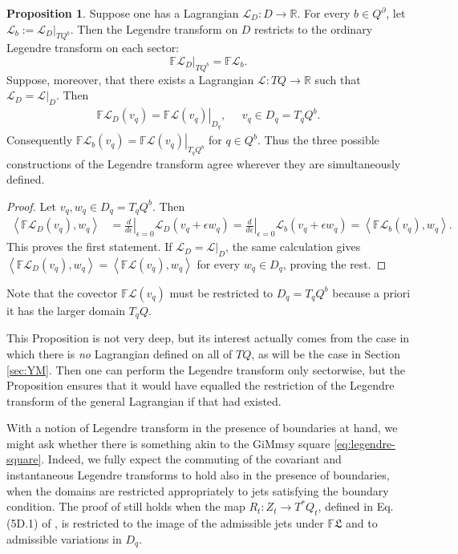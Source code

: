 \documentclass{article}
\newcommand{\R}{\mathbb{R}}
\theoremstyle{definition}
\newtheorem{proposition}[definition]{Proposition}
\begin{document}
\begin{proposition}\label{prop:legendresectors}
Suppose one has a Lagrangian $\mathcal{L}_D\colon D\to \R$. For every \(b\in Q^\partial\), let $\mathcal L_b:=\mathcal L_D|_{TQ^b}$. Then the Legendre transform on \(D\) restricts to the ordinary Legendre
transform on each sector:
\[
\left.\mathbb F\mathcal L_D\right|_{TQ^b}
=
\mathbb F\mathcal L_b.
\]
Suppose, moreover, that there exists a Lagrangian $\mathcal L\colon TQ\longrightarrow\mathbb R$ such that \(\mathcal L_D=\mathcal L|_D\). Then
\begin{align*}
\mathbb F\mathcal L_D(v_q)
=
\left.\mathbb F\mathcal L(v_q)\right|_{D_q},\;\;\;\;\; v_q\in D_q=T_qQ^b.
\end{align*}
Consequently $\mathbb F\mathcal L_b(v_q)
=
\left.\mathbb F\mathcal L(v_q)\right|_{T_qQ^b}$ for $q\in Q^b$. Thus the three possible constructions of the Legendre transform agree
wherever they are simultaneously defined.
\end{proposition}
\begin{proof}
Let \(v_q,w_q\in D_q=T_qQ^b\). Then
\begin{align*}
\left\langle\mathbb F\mathcal L_D(v_q),w_q\right\rangle
&=
\left.\frac{d}{d\epsilon}\right|_{\epsilon=0}
\mathcal L_D(v_q+\epsilon w_q)=
\left.\frac{d}{d\epsilon}\right|_{\epsilon=0}
\mathcal L_b(v_q+\epsilon w_q)=
\left\langle\mathbb F\mathcal L_b(v_q),w_q\right\rangle.
\end{align*}
This proves the first statement. If
\(\mathcal L_D=\mathcal L|_D\), the same calculation gives $\left\langle\mathbb F\mathcal L_D(v_q),w_q\right\rangle
=
\left\langle\mathbb F\mathcal L(v_q),w_q\right\rangle$ for every \(w_q\in D_q\), proving the rest.
\end{proof}
Note that the covector $\mathbb{F}\mathcal{L}(v_q)$ must be restricted to $D_q=T_q Q^b$ because a priori it has the larger domain $T_q Q$.

This Proposition is not very deep, but its interest actually comes from the case in which there is \textit{no} Lagrangian defined on all of $TQ$, as will be the case in Section \ref{sec:YM}. Then one can perform the Legendre transform only sectorwise, but the Proposition ensures that it would have equalled the restriction of the Legendre transform of the general Lagrangian if that had existed.

With a notion of Legendre transform in the presence of boundaries at hand, we might ask whether there is something akin to the GiMmsy square \eqref{eq:legendre-square}. Indeed, we fully expect the commuting of the covariant and instantaneous Legendre transforms to hold also in the presence of boundaries, when the domains are restricted appropriately to jets satisfying the boundary condition. The proof of \cite[Proposition 6.3]{gotayMomentumMapsClassical2004a} still holds when the map $R_t\colon Z_t\to T^*Q_t$, defined in Eq. (5D.1) of \cite{gotayMomentumMapsClassical2004a}, is restricted to the image of the admissible jets under $\mathbb{F}\mathfrak{L}$ and to admissible variations in $D_q$.
\end{document}
